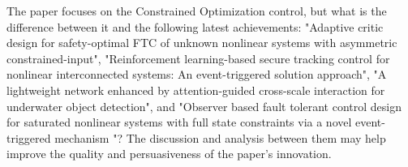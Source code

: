 \documentclass[12pt,english]{reviewresponse}
\begin{document}
% 
\begin{revcomment}[1]{}
	The paper focuses on the Constrained Optimization control, but what is the difference between it and the following latest achievements: "Adaptive critic design for safety-optimal FTC of unknown nonlinear systems with asymmetric constrained-input", "Reinforcement learning-based secure tracking control for nonlinear interconnected systems: An event-triggered solution approach", "A lightweight network enhanced by attention-guided cross-scale interaction for underwater object detection", and "Observer based fault tolerant control design for saturated nonlinear systems with full state constraints via a novel event-triggered mechanism "? The discussion and analysis between them may help improve the quality and persuasiveness of the paper's innovation.
\end{revcomment}
\end{document}

